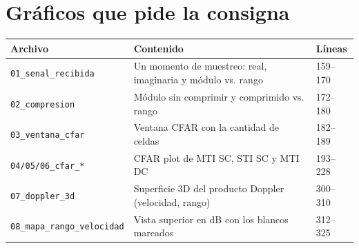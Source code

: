 \documentclass[11pt]{article}
\newcommand{\archivo}[1]{\texttt{#1}}
\begin{document}
\section{Gráficos que pide la consigna}
\begin{table}[H]
  \centering
  \small
  \begin{tabular}{l p{6cm} l}
    \toprule
    \textbf{Archivo} & \textbf{Contenido} & \textbf{Líneas} \\
    \midrule
    \archivo{01\_senal\_recibida} & Un momento de muestreo: real, imaginaria y módulo vs. rango & 159--170 \\
    \archivo{02\_compresion} & Módulo sin comprimir y comprimido vs. rango & 172--180 \\
    \archivo{03\_ventana\_cfar} & Ventana CFAR con la cantidad de celdas & 182--189 \\
    \archivo{04/05/06\_cfar\_*} & CFAR plot de MTI SC, STI SC y MTI DC & 193--228 \\
    \archivo{07\_doppler\_3d} & Superficie 3D del producto Doppler (velocidad, rango) & 300--310 \\
    \archivo{08\_mapa\_rango\_velocidad} & Vista superior en dB con los blancos marcados & 312--325 \\
    \bottomrule
  \end{tabular}
\end{table}
\end{document}
